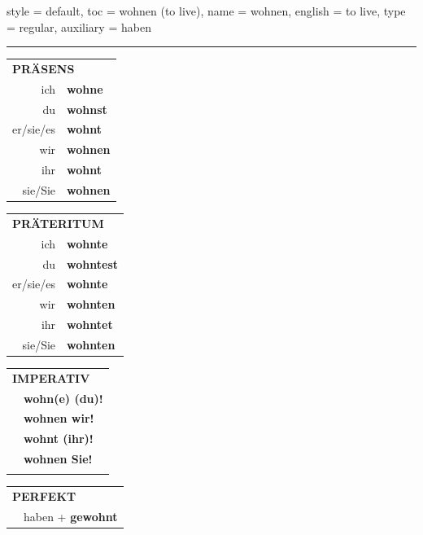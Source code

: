 \begin{verbentry}{
  style = {default},
  toc = {wohnen (to live)},
  name = {wohnen},
  english = {to live},
  type = {regular},
  auxiliary = {haben}
}
 
    
     \vspace{5pt}

    \hrule
    
    \vspace{5pt}

  \begin{tabular}{rl}
     \multicolumn{2}{l}{\textbf{PRÄSENS} }\\
    ich & \textbf{wohne}\\
    du & \textbf{wohnst}\\
    er/sie/es & \textbf{wohnt}\\
    wir & \textbf{wohnen}\\
    ihr & \textbf{wohnt}\\
    sie/Sie & \textbf{wohnen}\\
  \end{tabular}
  \hfill
     \begin{tabular}{rl}
    \multicolumn{2}{l}{\textbf{PRÄTERITUM} }\\
    ich & \textbf{wohnte}\\
    du & \textbf{wohntest}\\
    er/sie/es & \textbf{wohnte}\\
    wir & \textbf{wohnten}\\
    ihr & \textbf{wohntet}\\
    sie/Sie & \textbf{wohnten}\\
  \end{tabular}
  \hfill
  \begin{tabular}{rl}
     \multicolumn{2}{l}{\textbf{IMPERATIV} }\\
   & \textbf{wohn(e) (du)!}\\
   & \textbf{wohnen wir!}\\
   & \textbf{wohnt (ihr)!}\\
   & \textbf{wohnen Sie!}\\
   & \vspace{10pt}
  \end{tabular}

    \vspace{10pt}

 \begin{tabular}{rl}
     \multicolumn{2}{l}{\textbf{PERFEKT}}\\
   & haben + \textbf{gewohnt}\\
  \end{tabular}
\hfill
   \begin{tabular}{rl}
   

\end{tabular}
\end{verbentry}

